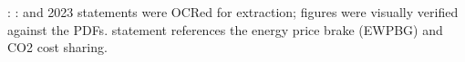 : \markdownRendererUlItemEnd 
{}: \markdownRendererUlItemEnd 
\markdownRendererUlEndTight \markdownRendererInterblockSeparator
{}
\markdownRendererSectionEnd \markdownRendererSectionBegin
{}\markdownRendererInterblockSeparator
{}\markdownRendererUlBeginTight
{} and 2023 statements were OCRed for extraction; figures were visually verified against the PDFs.\markdownRendererUlItemEnd 
{} statement references the energy price brake (EWPBG) and CO2 cost sharing.\markdownRendererUlItemEnd 
\markdownRendererUlEndTight 
\markdownRendererSectionEnd 
\markdownRendererSectionEnd \markdownRendererDocumentEnd